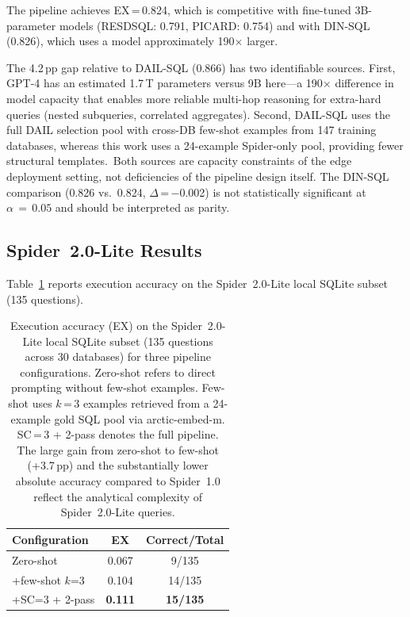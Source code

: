 The pipeline achieves EX\,=\,0.824, which is competitive with fine-tuned
3B-parameter models (RESDSQL: 0.791, PICARD: 0.754) and with DIN-SQL
(0.826), which uses a model approximately 190$\times$ larger.

The 4.2\,pp gap relative to DAIL-SQL (0.866) has two identifiable sources.
First, GPT-4 has an estimated 1.7\,T parameters versus 9B here---a 190$\times$
difference in model capacity that enables more reliable multi-hop reasoning
for extra-hard queries (nested subqueries, correlated aggregates).
Second, DAIL-SQL uses the full DAIL selection pool with cross-DB few-shot
examples from 147 training databases, whereas this work uses a 24-example
Spider-only pool, providing fewer structural templates.\
Both sources are capacity constraints of the edge deployment setting,
not deficiencies of the pipeline design itself.
The DIN-SQL comparison (0.826 vs.\ 0.824, $\Delta$\,=\,$-$0.002) is not
statistically significant at $\alpha\,=\,0.05$ and should be interpreted
as parity.

\subsection{Spider~2.0-Lite Results}

Table~\ref{tab:sp2} reports execution accuracy on the Spider~2.0-Lite
local SQLite subset (135 questions).

\begin{table}[!tbp]
  \centering
  \caption[Spider~2.0-Lite execution accuracy]{Execution accuracy (EX)
    on the Spider~2.0-Lite local SQLite subset (135 questions across
    30 databases) for three pipeline configurations.
    Zero-shot refers to direct prompting without few-shot examples.
    Few-shot uses $k$\,=\,3 examples retrieved from a 24-example gold
    SQL pool via arctic-embed-m.
    SC\,=\,3 + 2-pass denotes the full pipeline.
    The large gain from zero-shot to few-shot (+3.7\,pp) and the
    substantially lower absolute accuracy compared to Spider~1.0
    reflect the analytical complexity of Spider~2.0-Lite queries.}
  \label{tab:sp2}
  \begin{tabular}{lcc}
    \toprule
    Configuration & EX & Correct/Total \\
    \midrule
    Zero-shot            & 0.067 & 9/135  \\
    +few-shot $k$=3      & 0.104 & 14/135 \\
    +SC=3 + 2-pass       & \textbf{0.111}   & \textbf{15/135} \\
    \bottomrule
  \end{tabular}
\end{table}

